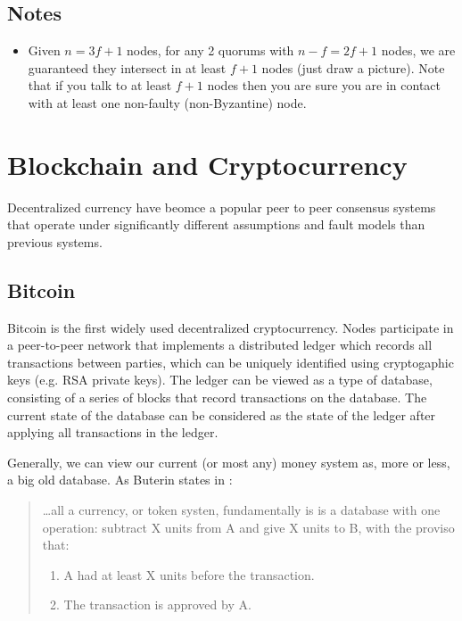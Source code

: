 \documentclass[10pt,a4paper]{article}
\begin{document}
\subsection{Notes}
\begin{itemize}
    \item Given $n=3f+1$ nodes, for any 2 quorums with $n-f = 2f+1$ nodes, we are guaranteed they intersect in at least $f+1$ nodes (just draw a picture). Note that if you talk to at least $f+1$ nodes then you are sure you are in contact with at least one non-faulty (non-Byzantine) node.
\end{itemize}

\section{Blockchain and Cryptocurrency}

Decentralized currency have beomce a popular peer to peer consensus systems that operate under significantly different assumptions and fault models than previous systems.

\subsection{Bitcoin}

Bitcoin \cite{nakamoto2009bitcoin} is the first widely used decentralized cryptocurrency. Nodes participate in a peer-to-peer network that implements a distributed ledger which records all transactions between parties, which can be uniquely identified using cryptogaphic keys (e.g. RSA private keys). The ledger can be viewed as a type of database, consisting of a series of blocks that record transactions on the database. The current state of the database can be considered as the state of the ledger after applying all transactions in the ledger.

Generally, we can view our current (or most any) money system as, more or less, a big old database. As Buterin states in \cite{Buterin2013}:

\begin{quote}
    \dots all a currency, or token systen, fundamentally is is a database with one operation: subtract X units from A and give X units to B, with the proviso that: 
    \begin{enumerate}[(1)]
        \item A had at least X units before the transaction.
        \item The transaction is approved by A. 
    \end{enumerate}
\end{quote}
\end{document}
